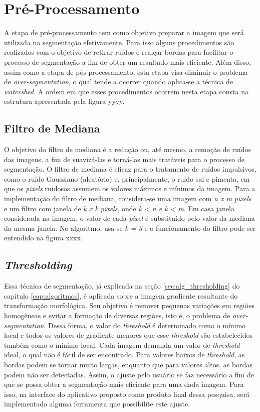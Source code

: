 

\section{Pré-Processamento}
A etapa de pré-processamento tem como objetivo preparar a imagem que será utilizada na segmentação efetivamente. Para isso alguns procedimentos são realizados com o objetivo de retirar ruídos e realçar bordas para facilitar o processo de segmentação a fim de obter um resultado mais eficiente. Além disso, assim como a etapa de pós-processamento, esta etapa visa diminuir o problema de \textit{over-segmentation}, o qual tende a ocorrer quando aplica-se a técnica de \textit{watershed}.
A ordem em que esses procedimentos ocorrem nesta etapa consta na estrutura apresentada pela figura yyyy.



\subsection{Filtro de Mediana}
O objetivo do filtro de mediana é a redução ou, até mesmo, a remoção de ruídos das imagens, a fim de suavizá-las e torná-las mais tratáveis para o processo de segmentação. O filtro de mediana é eficaz para o tratamento de ruídos impulsivos, como o ruído Gaussiano (aleatório) e, principalmente, o ruído sal e pimenta, em que os \textit{pixels} ruidosos assumem os valores máximos e mínimos da imagem.
Para a implementação do filtro de mediana, considera-se uma imagem com \textit{n x m pixels} e um filtro com janela de \textit{k x k pixels}, onde \textit{k < n e k < m}. Em casa janela considerada na imagem, o valor de cada \textit{pixel} é substituído pelo valor da mediana da mesma janela. No algoritmo, usa-se \textit{k = 3} e o funcionamento do filtro pode ser entendido na figura xxxx.


\subsection{\textit{Thresholding}}
Essa técnica de segmentação, já explicada na seção \ref{sec:alg_thresholding} do capítulo \ref{cap:algoritmos}, é aplicada sobre a imagem gradiente resultante do transformação morfológica. Seu objetivo é remover pequenas variações em regiões homogêneas e evitar a formação de diversas regiões, isto é, o problema de \textit{over-segmentation}. Dessa forma, o valor do \textit{threshold} é determinado como o mínimo local e todos os valores de gradiente menores que esse \textit{threshold} são estabelecidos também como o mínimo local.
Cada imagem demanda um valor de \textit{threshold} ideal, o qual não é fácil de ser encontrado. Para valores baixos de \textit{threshold}, as bordas podem se tornar muito largas, enquanto que para valores altos, as bordas podem não ser detectadas.
Assim, o ajuste pelo usuário se faz necessário a fim de que se possa obter a segmentação mais eficiente para uma dada imagem. Para isso, na interface do aplicativo proposto como produto final dessa pesquisa, será implementado alguma ferramenta que possibilite este ajuste.

